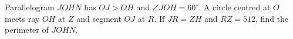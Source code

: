 Parallelogram $JOHN$ has $OJ>OH$ and $\angle JOH=60^\circ$. A circle centred at $O$ meets ray $OH$ at $Z$ and segment $OJ$ at $R$. If $JR=ZH$ and $RZ=512$, find the perimeter of $JOHN$.
